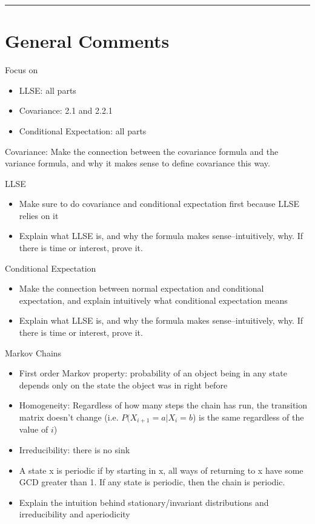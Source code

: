 \documentclass{exam}
\title{}
\date{LLSE, Covariance, Conditional Expectation, and Markov Chains}
\begin{document}
\maketitle
\rule{\textwidth}{0.15em}
\fontsize{12}{15}\selectfont
\thispagestyle{empty}


\section{General Comments}
\begin{questions}
\item Focus on
\begin{itemize}
\item LLSE: all parts
\item Covariance: 2.1 and 2.2.1
\item Conditional Expectation: all parts
\end{itemize}
\item Covariance: Make the connection between the covariance formula and the variance formula, and why it makes sense to define covariance this way.
\item LLSE
\begin{itemize}
\item Make sure to do covariance and conditional expectation first because LLSE relies on it
\item Explain what LLSE is, and why the formula makes sense--intuitively, why. If there is time or interest, prove it.
\end{itemize}

\item Conditional Expectation
\begin{itemize}
\item Make the connection between normal expectation and conditional expectation, and explain intuitively what conditional expectation means
\item Explain what LLSE is, and why the formula makes sense--intuitively, why. If there is time or interest, prove it.
\end{itemize}
\item Markov Chains
\begin{itemize}
\item First order Markov property: probability of an object being in any state depends only on the state the object was in right before
\item Homogeneity: Regardless of how many steps the chain has run, the transition matrix doesn’t change (i.e. $P(X_{i+1} = a | X_{i} = b$) is the same regardless of the value of $i$)
\item Irreducibility: there is no sink
\item A state x is periodic if by starting in x, all ways of returning to x have some GCD greater than 1. If any state is periodic, then the chain is periodic.
\item Explain the intuition behind stationary/invariant distributions and irreducibility and aperiodicity
\end{itemize}
\end{questions}
\end{document}
